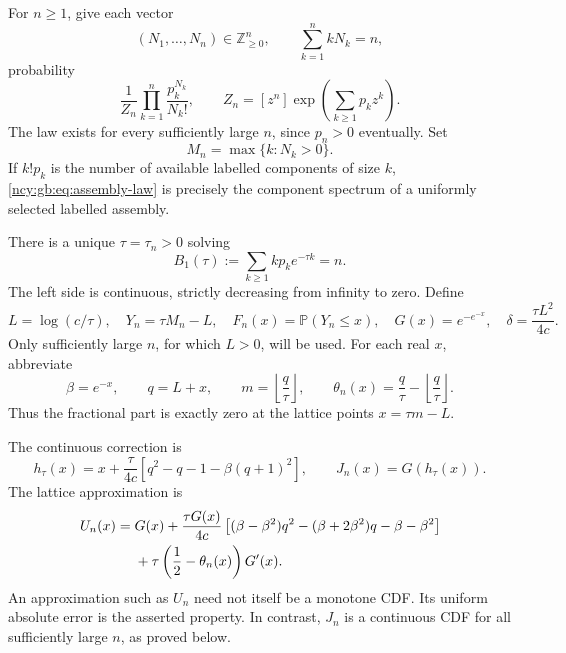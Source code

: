 \documentclass[11pt,letterpaper]{article}
\numberwithin{equation}{section}
\theoremstyle{remark}\newtheorem{remark}[theorem]{Remark}
\theoremstyle{definition}\newtheorem{definition}[theorem]{Definition}\theoremstyle{plain}
\newcommand{\Pbb}{\mathbb P}
\newcommand{\Z}{\mathbb Z}
\begin{document}
For \(n\ge1\), give each vector
\[
 (N_1,\ldots,N_n)\in\Z_{\ge0}^n,\qquad \sum_{k=1}^n kN_k=n,
\]
probability
\begin{equation}\label{ncy:gb:eq:assembly-law}
 \frac{1}{Z_n}\prod_{k=1}^n\frac{p_k^{N_k}}{N_k!},
 \qquad
 Z_n=[z^n]\exp\left(\sum_{k\ge1}p_kz^k\right).
\end{equation}
The law exists for every sufficiently large \(n\), since \(p_n>0\)
eventually. Set
\[
 M_n=\max\{k:N_k>0\}.
\]
If \(k!p_k\) is the number of available labelled components of size
\(k\), \eqref{ncy:gb:eq:assembly-law} is precisely the component spectrum of
a uniformly selected labelled assembly.

There is a unique \(\tau=\tau_n>0\) solving
\begin{equation}\label{ncy:gb:eq:saddle}
 B_1(\tau):=\sum_{k\ge1}kp_ke^{-\tau k}=n.
\end{equation}
The left side is continuous, strictly decreasing from infinity to
zero. Define
\begin{equation}\label{ncy:gb:eq:main-notation}
 L=\log(c/\tau),\quad Y_n=\tau M_n-L,\quad
 F_n(x)=\Pbb(Y_n\le x),\quad G(x)=e^{-e^{-x}},
 \quad \delta=\frac{\tau L^2}{4c}.
\end{equation}
Only sufficiently large \(n\), for which \(L>0\), will be used.
For each real \(x\), abbreviate
\begin{equation}\label{ncy:gb:eq:local-notation}
 \beta=e^{-x},\qquad q=L+x,\qquad
 m=\left\lfloor\frac q\tau\right\rfloor,\qquad
 \theta_n(x)=\frac q\tau-\left\lfloor\frac q\tau\right\rfloor.
\end{equation}
Thus the fractional part is exactly zero at the lattice points
\(x=\tau m-L\).

The continuous correction is
\begin{equation}\label{ncy:gb:eq:hfull}
 h_\tau(x)=x+\frac{\tau}{4c}
 \left[q^2-q-1-\beta(q+1)^2\right],
 \qquad J_n(x)=G(h_\tau(x)).
\end{equation}
The lattice approximation is
\begin{align}
 U_n(x)={}&G(x)
 +\frac{\tau G(x)}{4c}
 \left[(\beta-\beta^2)q^2-(\beta+2\beta^2)q-\beta-\beta^2\right]
 \notag\\
 &+\tau\left(\frac12-\theta_n(x)\right)G'(x).
 \label{ncy:gb:eq:Un}
\end{align}
An approximation such as \(U_n\) need not itself be a monotone CDF.
Its uniform absolute error is the asserted property.
In contrast, \(J_n\) is a continuous CDF for all sufficiently large
\(n\), as proved below.
\end{document}
